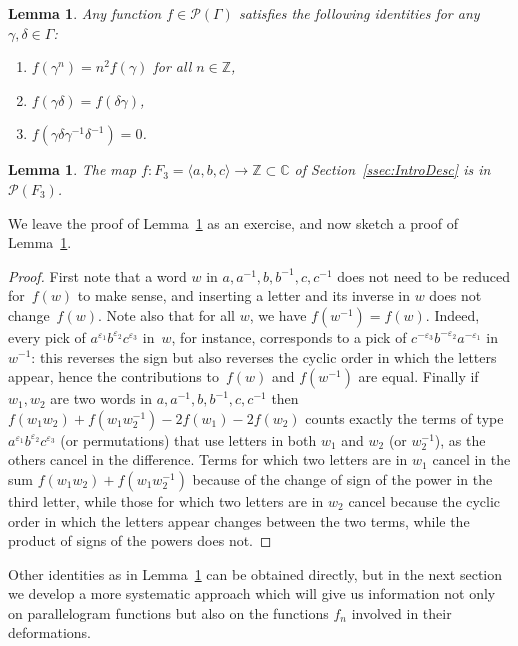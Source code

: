 \documentclass[11pt]{article}
\let\mathcal\mathscr
\newtheorem{lemma}[theorem]{Lemma}
\theoremstyle{definition}
\newcommand{\ZZ}{\mathbb{Z}}
\newcommand{\CC}{\mathbb{C}}
\begin{document}
\begin{lemma}\label{lem:Elem}
Any function $f\!\in\!\mathcal{P}(\Gamma)$ satisfies the following
identities for any $\gamma,\delta\!\in\!\Gamma$:
\begin{enumerate}
\item $f(\gamma^n)=n^2f(\gamma)$ for all $n\in \ZZ$,
\item $f(\gamma\delta)=f(\delta\gamma)$,
\item $f(\gamma\delta\gamma^{-1}\delta^{-1})=0$.
\end{enumerate}
\end{lemma}
\begin{lemma}\label{lem:Premiere}
The map $f\colon F_3=\langle a,b,c\rangle\to\ZZ\subset\CC$
of Section~\ref{ssec:IntroDesc} is in $\mathcal{P}(F_3)$.
\end{lemma}
We leave the proof of Lemma~\ref{lem:Elem} as an exercise, and now sketch
a proof of Lemma~\ref{lem:Premiere}.
\begin{proof}
First note that a word $w$ in $a,a^{-1},b,b^{-1},c,c^{-1}$ does not need
to be reduced for~$f(w)$ to make sense, and inserting a letter and its inverse
in $w$ does not change~$f(w)$. Note also that for all $w$, we have
$f(w^{-1})=f(w)$. Indeed, every pick of
$a^{\varepsilon_1}b^{\varepsilon_2}c^{\varepsilon_3}$ in~$w$, for instance,
corresponds to a pick of $c^{-\varepsilon_3}b^{-\varepsilon_2}a^{-\varepsilon_1}$
in $w^{-1}$: this reverses the sign but also reverses the cyclic order in
which the letters appear, hence the contributions to~$f(w)$ and $f(w^{-1})$
are equal. Finally if $w_1,w_2$ are two words in $a,a^{-1},b,b^{-1},c,c^{-1}$
then $f(w_1w_2)+f(w_1w_2^{-1})-2f(w_1)-2f(w_2)$ counts exactly the
terms of type $a^{\varepsilon_1}b^{\varepsilon_2}c^{\varepsilon_3}$
(or permutations) that use letters in both $w_1$ and $w_2$ (or $w_2^{-1}$),
as the others cancel in the difference. Terms for which two letters are
in $w_1$ cancel in the sum $f(w_1w_2)+f(w_1w_2^{-1})$ because of the change
of sign of the power in the third letter, while those for which two letters
are in $w_2$ cancel because the cyclic order in which the letters appear
changes between the two terms, while the product of signs of the powers
does not.
\end{proof}

Other identities as in Lemma~\ref{lem:Elem} can be obtained directly,
but in the next section we develop a more systematic approach which
will give us information not only on parallelogram functions but also on the
functions $f_n$ involved in their deformations.
\end{document}
